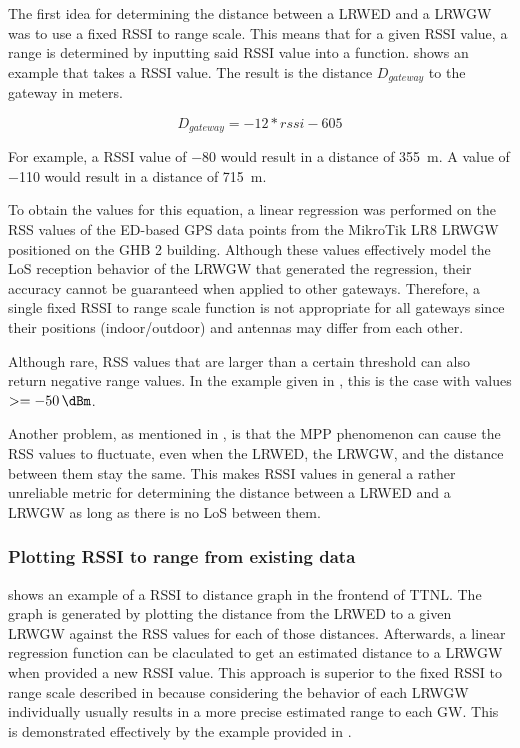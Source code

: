 The first idea for determining the distance between a \acl{LRWED} and a \acl{LRWGW} was to use a fixed \ac{RSSI} to range scale.
This means that for a given \ac{RSSI} value, a range is determined by inputting said \ac{RSSI} value into a function.
 shows an example that takes a \ac{RSSI} value.
The result is the distance $D_{gateway}$ to the gateway in meters.

\begin{equation}\label{eq:fixed-rssi-to-range-scale}
    D_{gateway} = -12 * rssi - 605
\end{equation}

For example, a \ac{RSSI} value of \SI{-80}{\dBm} would result in a distance of \SI{355}{\meter}.
A value of \SI{-110}{\dBm} would result in a distance of \SI{715}{\meter}.

To obtain the values for this equation, a linear regression was performed on the \ac{RSS} values of the \acl{ED}-based GPS data points from the MikroTik LR8 \acl{LRWGW} positioned on the \ac{GHB} 2 building.
Although these values effectively model the \ac{LoS} reception behavior of the \acl{LRWGW} that generated the regression, their accuracy cannot be guaranteed when applied to other gateways.
Therefore, a single fixed \ac{RSSI} to range scale function is not appropriate for all gateways since their positions (indoor/outdoor) and antennas may differ from each other.

Although rare, \ac{RSS} values that are larger than a certain threshold can also return negative range values.
In the example given in , this is the case with values $>=\SI{-50}{\dBm}$.

Another problem, as mentioned in , is that the \ac{MPP} phenomenon can cause the \ac{RSS} values to fluctuate, even when the \acl{LRWED}, the \acl{LRWGW}, and the distance between them stay the same.
This makes RSSI values in general a rather unreliable metric for determining the distance between a \acl{LRWED} and a \acl{LRWGW} as long as there is no \ac{LoS} between them.

\subsubsection{Plotting \acl{RSSI} to range from existing data}\label{sec:plotting-rssi-to-range-from-existing-data}

 shows an example of a \ac{RSSI} to distance graph in the frontend of \ac{TTNL}.
The graph is generated by plotting the distance from the \acl{LRWED} to a given \acl{LRWGW} against the \ac{RSS} values for each of those distances.
Afterwards, a linear regression function can be claculated to get an estimated distance to a \acl{LRWGW} when provided a new \ac{RSSI} value.
This approach is superior to the fixed \ac{RSSI} to range scale described in  because considering the behavior of each \acl{LRWGW} individually usually results in a more precise estimated range to each \acl{GW}.
This is demonstrated effectively by the example provided in .


